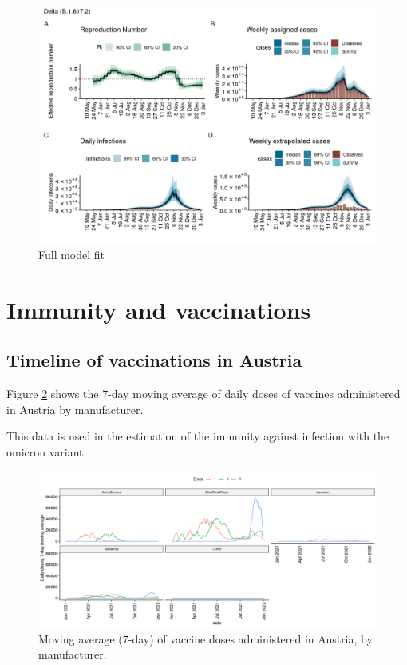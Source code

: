 \documentclass[
]{article}
\begin{document}
\begin{figure}

{\centering \includegraphics[width=0.8\linewidth]{omicron_austria_files/figure-latex/epidemia-full-delta-fit-1} 

}

\caption{Full model fit}\label{fig:epidemia-full-delta-fit}
\end{figure}

\hypertarget{immunity-and-vaccinations}{%
\section{Immunity and vaccinations}\label{immunity-and-vaccinations}}

\hypertarget{timeline-of-vaccinations-in-austria}{%
\subsection{Timeline of vaccinations in Austria}\label{timeline-of-vaccinations-in-austria}}

Figure \ref{fig:vaccine-doses-austria} shows the 7-day moving average of
daily doses of vaccines administered in Austria by manufacturer. \autocite{bmsgpkCOVID19ZeitreiheVerabreichten}

This data is used in the estimation of the immunity against infection
with the omicron variant.

\begin{figure}

{\centering \includegraphics[width=1\linewidth]{omicron_austria_files/figure-latex/vaccine-doses-austria-1} 

}

\caption{Moving average (7-day) of vaccine doses administered in Austria, by manufacturer.}\label{fig:vaccine-doses-austria}
\end{figure}
\end{document}
